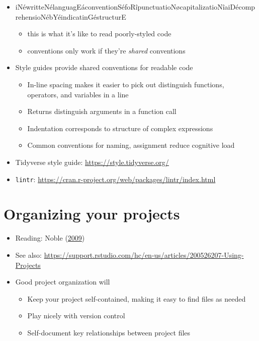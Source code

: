 \documentclass[
]{article}
\providecommand{\tightlist}{%
  \setlength{\itemsep}{0pt}\setlength{\parskip}{0pt}}
\begin{document}
\begin{itemize}
\item
  iNéwritteNélanguagEáconventionSéfoRîpunctuatioNøcapitalizatioNîaiDécomprehensioNébYéindicatinGéstructurE

  \begin{itemize}
  \tightlist
  \item
    this is what it's like to read poorly-styled code
  \item
    conventions only work if they're \emph{shared} conventions
  \end{itemize}
\item
  Style guides provide shared conventions for readable code

  \begin{itemize}
  \tightlist
  \item
    In-line spacing makes it easier to pick out distinguish functions, operators, and variables in a line
  \item
    Returns distinguish arguments in a function call
  \item
    Indentation corresponds to structure of complex expressions
  \item
    Common conventions for naming, assignment reduce cognitive load
  \end{itemize}
\item
  Tidyverse style guide: \url{https://style.tidyverse.org/}
\item
  \texttt{lintr}: \url{https://cran.r-project.org/web/packages/lintr/index.html}
\end{itemize}

\hypertarget{organizing-your-projects}{%
\section{Organizing your projects}\label{organizing-your-projects}}

\begin{itemize}
\item
  Reading: Noble (\protect\hyperlink{ref-NobleQuickGuideOrganizing2009}{2009})
\item
  See also: \url{https://support.rstudio.com/hc/en-us/articles/200526207-Using-Projects}
\item
  Good project organization will

  \begin{itemize}
  \tightlist
  \item
    Keep your project self-contained, making it easy to find files as needed
  \item
    Play nicely with version control
  \item
    Self-document key relationships between project files
  \end{itemize}
\end{itemize}
\end{document}

